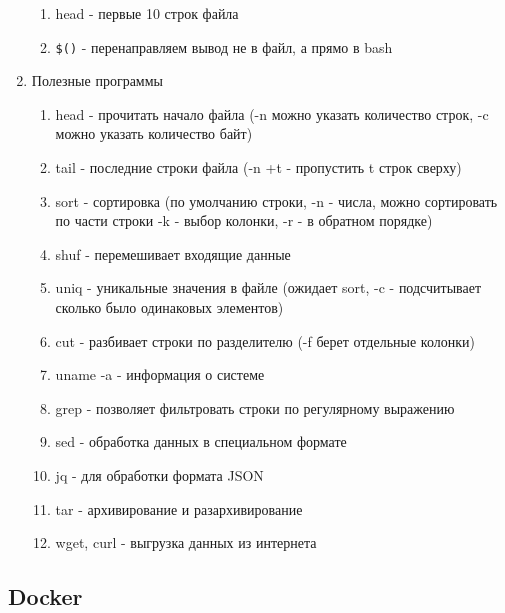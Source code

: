 \documentclass[a4paper, 12pt]{article}
\begin{document}
\begin{enumerate}
\begin{enumerate}
    \item head - первые 10 строк файла 
    \item \verb+$()+ - перенаправляем вывод не в файл, а прямо в bash
  \end{enumerate}
  \item Полезные программы
  \begin{enumerate}
    \item head - прочитать начало файла (-n можно указать количество строк, -c можно указать количество байт)
    \item tail - последние строки файла (-n +t - пропустить t строк сверху)
    \item sort - сортировка (по умолчанию строки, -n - числа, можно сортировать по части строки -k - выбор колонки, -r - в обратном порядке)
    \item shuf - перемешивает входящие данные
    \item uniq - уникальные значения в файле (ожидает sort, -c - подсчитывает сколько было одинаковых элементов)
    \item cut - разбивает строки по разделителю (-f берет отдельные колонки)
    \item uname -a - информация о системе
    \item grep - позволяет фильтровать строки по регулярному выражению
    \item sed - обработка данных в специальном формате
    \item jq - для обработки формата JSON
    \item tar - архивирование и разархивирование
    \item wget, curl - выгрузка данных из интернета
  \end{enumerate}
\end{enumerate}

\subsection{Docker}
\end{document}
